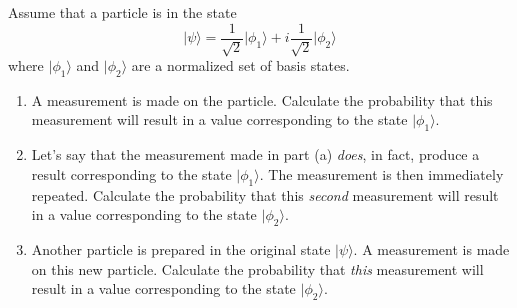 \begin{problem}
Assume that a particle is in the state
\[ \vert\mbox{$\psi$}\rangle = \frac{1}{\sqrt{2}} \vert\mbox{$\phi_1$}\rangle + i \frac{1}{\sqrt{2}} \vert\mbox{$\phi_2$}\rangle \]
where $\vert\mbox{$\phi_1$}\rangle$ and $\vert\mbox{$\phi_2$}\rangle$ are a normalized set of basis states.
\begin{enumerate}
\item A measurement is made on the particle.
Calculate the probability that this measurement will result in a value 
corresponding to the state $\vert\mbox{$\phi_1$}\rangle$.
\item Let's say that the measurement made in part (a) {\it does},
in fact, produce a result corresponding to the state
$\vert\mbox{$\phi_1$}\rangle$. 
The measurement is then immediately repeated.  Calculate the probability 
that this {\it second} measurement will result in a value corresponding
to the state $\vert\mbox{$\phi_2$}\rangle$.
\item Another particle is prepared in the original state $\vert\mbox{$\psi$}\rangle$. 
A measurement is made on this new particle. Calculate the probability 
that {\it this} measurement will result in a value corresponding to
the state $\vert\mbox{$\phi_2$}\rangle$.
\end{enumerate}
\label{prob:SuperpositionProbs}
\end{problem}

